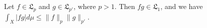 Let $f \in \mathfrak{L}_p$ and $g \in \mathfrak{L}_{p'}$, where $p > 1$. Then $fg \in \mathfrak{L}_1$, and we have $\int_X |fg| d\mu \leq \|f\|_p \|g\|_{p'}$.
